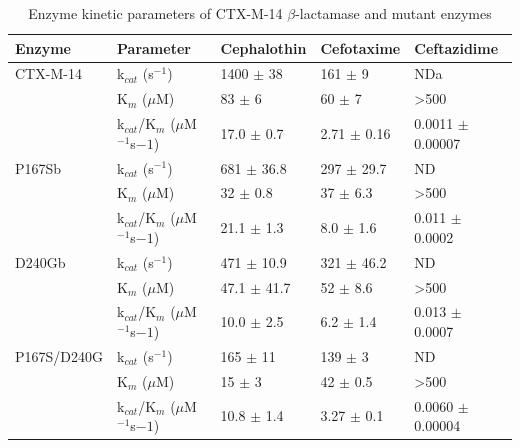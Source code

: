 \documentclass[../main.tex]{subfiles}
\begin{document}
        \begin{table}[]
        \centering
        \caption[Enzyme kinetic parameters of CTX-M-14 $\beta$-lactamase and mutant enzymes]{Enzyme kinetic parameters of CTX-M-14 $\beta$-lactamase and mutant enzymes}
        \label{tab:ch2-tab2}
        \begin{tabular}{|l|l|l|l|l|}
        \hline
        Enzyme      & Parameter         & Cephalothin & Cefotaxime  & Ceftazidime       \\ \hline
        CTX-M-14    & k$_{cat}$ (s$^{-1}$)        & 1400 $\pm$ 38   & 161 $\pm$ 9     & NDa               \\\
                    & K$_{m}$ ($\mu$M)           & 83 $\pm$ 6      & 60 $\pm$ 7      & \textgreater{}500 \\
                    & k$_{cat}$/K$_{m}$ ($\mu$M$^{-1}$s$-1$) & 17.0 $\pm$ 0.7  & 2.71 $\pm$ 0.16 & 0.0011 $\pm$ 0.00007  \\ \hline
        P167Sb      & k$_{cat}$ (s$^{-1}$)        & 681 $\pm$ 36.8  & 297 $\pm$ 29.7  & ND                \\
                    & K$_{m}$ ($\mu$M)           & 32 $\pm$ 0.8    & 37 $\pm$ 6.3    & \textgreater{}500 \\
                    & k$_{cat}$/K$_{m}$ ($\mu$M$^{-1}$s$-1$) & 21.1 $\pm$ 1.3  & 8.0 $\pm$ 1.6   & 0.011 $\pm$ 0.0002    \\ \hline
        D240Gb      & k$_{cat}$ (s$^{-1}$)        & 471 $\pm$ 10.9  & 321 $\pm$ 46.2  & ND                \\
                    & K$_{m}$ ($\mu$M)           & 47.1 $\pm$ 41.7 & 52 $\pm$ 8.6    & \textgreater{}500 \\
                    & k$_{cat}$/K$_{m}$ ($\mu$M$^{-1}$s$-1$) & 10.0 $\pm$ 2.5  & 6.2 $\pm$ 1.4   & 0.013 $\pm$ 0.0007    \\ \hline
        P167S/D240G & k$_{cat}$ (s$^{-1}$)        & 165 $\pm$ 11    & 139 $\pm$ 3     & ND                \\
                    & K$_{m}$ ($\mu$M)           & 15 $\pm$ 3      & 42 $\pm$ 0.5    & \textgreater{}500 \\
                    & k$_{cat}$/K$_{m}$ ($\mu$M$^{-1}$s$-1$) & 10.8 $\pm$ 1.4  & 3.27 $\pm$ 0.1  & 0.0060 $\pm$ 0.00004 \\ \hline
        \end{tabular}
        \end{table}
\end{document}
